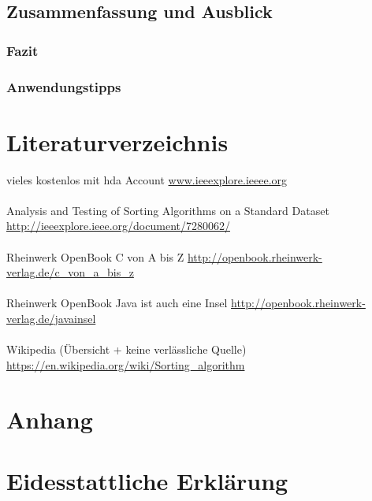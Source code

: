\documentclass{article}
\begin{document}
\subsection{Zusammenfassung und Ausblick}
\subsubsection{Fazit}
\subsubsection{Anwendungstipps}



\section{Literaturverzeichnis}
vieles kostenlos mit hda Account  \url {www.ieeexplore.ieeee.org} \\ \\
Analysis and Testing of Sorting Algorithms on a 
Standard Dataset \url {http://ieeexplore.ieee.org/document/7280062/}\\ \\
Rheinwerk OpenBook C von A bis Z \url {http://openbook.rheinwerk-verlag.de/c_von_a_bis_z} \\ \\
Rheinwerk OpenBook Java ist auch eine Insel \url {http://openbook.rheinwerk-verlag.de/javainsel} \\ \\
Wikipedia (Übersicht + keine verlässliche Quelle) \url {https://en.wikipedia.org/wiki/Sorting_algorithm}

\section{Anhang}

\section{Eidesstattliche Erklärung}
\end{document}
